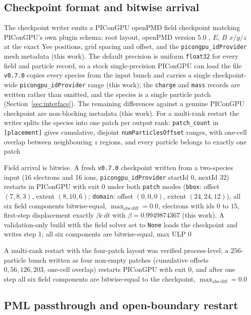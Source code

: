 \subsection{Checkpoint format and bitwise arrival}

The checkpoint writer emits a PIConGPU openPMD field checkpoint matching
PIConGPU's own plugin schema: root layout, openPMD version 5.0 \citep{openpmd},
$E$, $B$
$x/y/z$ at the exact Yee positions, grid spacing and offset, and the
\texttt{picongpu\_idProvider} mesh metadata (this work). The default
precision is uniform \texttt{float32} for every field and particle record, so
a stock single-precision PIConGPU can load the file
 \texttt{v0.7.0} copies every species from the input bunch and carries a single
 checkpoint-wide \texttt{picongpu\_idProvider} range (this work);
 the \texttt{charge} and \texttt{mass} records are written rather than omitted,
 and the species is a single particle patch (Section~\ref{sec:interface}). The
 remaining differences against a genuine PIConGPU checkpoint are non-blocking
 metadata (this work). For a multi-rank restart the writer splits the species
 into one patch per output rank: \texttt{patch\_count} in
 \texttt{[placement]} gives cumulative, disjoint
 \texttt{numParticlesOffset} ranges, with one-cell overlap between neighbouring
 $z$ regions, and every particle belongs to exactly one patch


 Field arrival is bitwise. A fresh \texttt{v0.7.0} checkpoint written from a
 two-species input (16 electrons and 16 ions, \texttt{picongpu\_idProvider}
 startId $0$, nextId $32$) restarts in PIConGPU with exit $0$ under both
 \texttt{patch} modes (\texttt{bbox}: offset $(7,8,3)$, extent $(8,10,6)$;
 \texttt{domain}: offset $(0,0,0)$, extent $(24,24,12)$), all six field
 components bitwise-equal, $\max_\mathrm{abs\ diff} = 0.0$, electrons with ids
 $0$ to $15$, first-step displacement exactly $\beta c\,dt$ with
 $\beta = 0.9949874367$ (this work). A validation-only build with the field
 solver set to \texttt{None} loads the checkpoint and writes step 1; all six
 components are bitwise-equal, max ULP $0$

 A multi-rank restart with the four-patch layout was verified
 process-level: a $256$-particle bunch written as four non-empty patches
 (cumulative offsets $0,56,126,203$, one-cell overlap) restarts PIConGPU with
 exit $0$, and after one step all six field components are bitwise-equal to the
 checkpoint, $\max_\mathrm{abs\ diff}=0.0$

 \subsection{PML passthrough and open-boundary restart}

